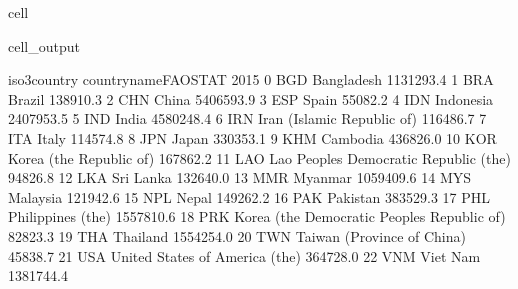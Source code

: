 \documentclass[letterpaper,10pt,english]{jupyterBook}
\begin{document}
\begin{sphinxuseclass}{cell}
\begin{sphinxVerbatimOutput}
\begin{sphinxuseclass}{cell_output}
\begin{sphinxVerbatim}[commandchars=\\\{\}]
   iso3\PYGZus{}country                         country\PYGZus{}name\PYGZus{}FAOSTAT       2015  \PYGZbs{}
0           BGD                                   Bangladesh  1131293.4   
1           BRA                                       Brazil   138910.3   
2           CHN                                        China  5406593.9   
3           ESP                                        Spain    55082.2   
4           IDN                                    Indonesia  2407953.5   
5           IND                                        India  4580248.4   
6           IRN                   Iran (Islamic Republic of)   116486.7   
7           ITA                                        Italy   114574.8   
8           JPN                                        Japan   330353.1   
9           KHM                                     Cambodia   436826.0   
10          KOR                      Korea (the Republic of)   167862.2   
11          LAO       Lao People\PYGZsq{}s Democratic Republic (the)    94826.8   
12          LKA                                    Sri Lanka   132640.0   
13          MMR                                      Myanmar  1059409.6   
14          MYS                                     Malaysia   121942.6   
15          NPL                                        Nepal   149262.2   
16          PAK                                     Pakistan   383529.3   
17          PHL                            Philippines (the)  1557810.6   
18          PRK  Korea (the Democratic People\PYGZsq{}s Republic of)    82823.3   
19          THA                                     Thailand  1554254.0   
20          TWN                   Taiwan (Province of China)    45838.7   
21          USA               United States of America (the)   364728.0   
22          VNM                                     Viet Nam  1381744.4   


\end{sphinxVerbatim}
\end{sphinxuseclass}
\end{sphinxVerbatimOutput}
\end{sphinxuseclass}
\end{document}
